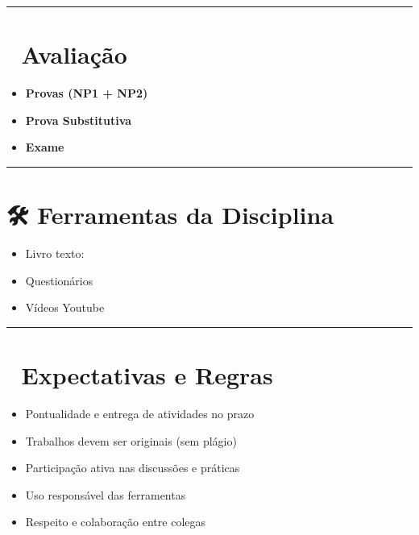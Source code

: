 \documentclass[
]{book}
\providecommand{\tightlist}{%
  \setlength{\itemsep}{0pt}\setlength{\parskip}{0pt}}
\begin{document}
\begin{center}\rule{0.5\linewidth}{0.5pt}\end{center}

\section{📝 Avaliação}\label{avaliauxe7uxe3o}

\begin{itemize}
\tightlist
\item
  \textbf{Provas (NP1 + NP2)}
\item
  \textbf{Prova Substitutiva}
\item
  \textbf{Exame}
\end{itemize}

\begin{center}\rule{0.5\linewidth}{0.5pt}\end{center}

\section{🛠️ Ferramentas da Disciplina}\label{ferramentas-da-disciplina}

\begin{itemize}
\item
  Livro texto:
\item
  Questionários
\item
  Vídeos Youtube
\end{itemize}

\begin{center}\rule{0.5\linewidth}{0.5pt}\end{center}

\section{📌 Expectativas e Regras}\label{expectativas-e-regras}

\begin{itemize}
\tightlist
\item
  Pontualidade e entrega de atividades no prazo
\item
  Trabalhos devem ser originais (sem plágio)
\item
  Participação ativa nas discussões e práticas
\item
  Uso responsável das ferramentas
\item
  Respeito e colaboração entre colegas
\end{itemize}
\end{document}
